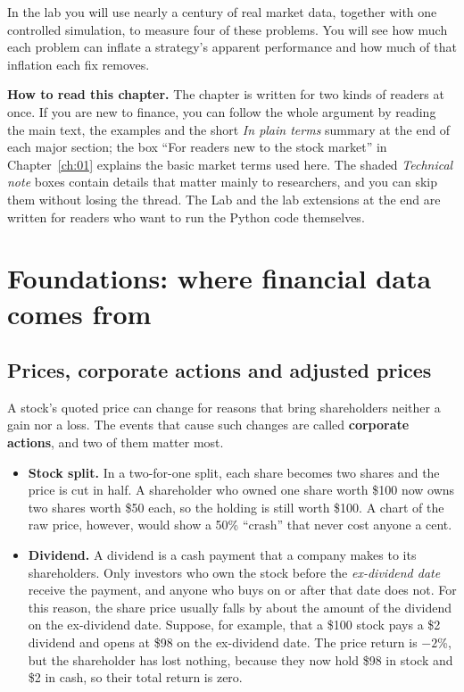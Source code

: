 In the lab you will use nearly a century of real market data, together with one controlled simulation, to measure four of these problems. You will see how much each problem can inflate a strategy's apparent performance and how much of that inflation each fix removes.

\begin{callout}
\textbf{How to read this chapter.} The chapter is written for two kinds of readers at once. If you are new to finance, you can follow the whole argument by reading the main text, the examples and the short \emph{In plain terms} summary at the end of each major section; the box ``For readers new to the stock market'' in Chapter~\ref{ch:01} explains the basic market terms used here. The shaded \emph{Technical note} boxes contain details that matter mainly to researchers, and you can skip them without losing the thread. The Lab and the lab extensions at the end are written for readers who want to run the Python code themselves.
\end{callout}

\section{Foundations: where financial data comes from}
\label{sec:02-foundations}

\subsection{Prices, corporate actions and adjusted prices}

A stock's quoted price can change for reasons that bring shareholders neither a gain nor a loss. The events that cause such changes are called \textbf{corporate actions}, and two of them matter most.

\begin{itemize}
  \item \textbf{Stock split.} In a two-for-one split, each share becomes two shares and the price is cut in half. A shareholder who owned one share worth \$100 now owns two shares worth \$50 each, so the holding is still worth \$100. A chart of the raw price, however, would show a 50\% ``crash'' that never cost anyone a cent.
  \item \textbf{Dividend.} A dividend is a cash payment that a company makes to its shareholders. Only investors who own the stock before the \emph{ex-dividend date} receive the payment, and anyone who buys on or after that date does not. For this reason, the share price usually falls by about the amount of the dividend on the ex-dividend date. Suppose, for example, that a \$100 stock pays a \$2 dividend and opens at \$98 on the ex-dividend date. The price return is $-2$\%, but the shareholder has lost nothing, because they now hold \$98 in stock and \$2 in cash, so their total return is zero.
\end{itemize}

